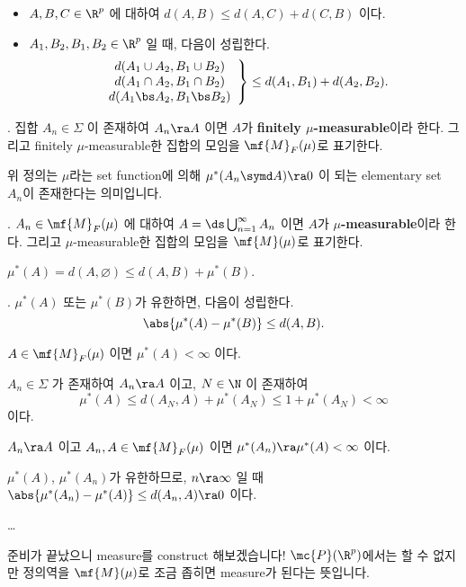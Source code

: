 \rmk
\begin{itemize}
    \item \(A, B, C \in \R^p\) 에 대하여 \(d(A, B) \leq d(A, C) + d(C, B)\) 이다.
    \item \(A_1, B_2, B_1, B_2 \in \R^p\) 일 때, 다음이 성립한다.
          \[
              \left.\begin{array}{c}d(A_1 \cup A_2, B_1 \cup B_2) \\d(A_1 \cap A_2, B_1 \cap B_2) \\d(A_1 \bs A_2, B_1 \bs B_2)\end{array}\right\}
              \leq d(A_1, B_1) + d(A_2, B_2).
          \]
\end{itemize}

.  집합 \(A_n \in \Sigma\) 이 존재하여 \(A_n \ra A\) 이면 \(A\)가 \textbf{finitely \(\mu\)-measurable}이라 한다. 그리고 finitely \(\mu\)-measurable한 집합의 모임을 \(\mf{M}_F(\mu)\)로 표기한다.

위 정의는 \(\mu\)라는 set function에 의해 \(\mu^\ast (A_n \symd A) \ra 0\) 이 되는 elementary set \(A_n\)이 존재한다는 의미입니다.

.  \(A_n \in \mf{M}_F(\mu)\) 에 대하여 \(A = \ds \bigcup_{n=1}^\infty A_n\) 이면 \(A\)가 \textbf{\(\mu\)-measurable}이라 한다. 그리고 \(\mu\)-measurable한 집합의 모임을 \(\mf{M}(\mu)\)로 표기한다.

\rmk \(\mu^\ast(A) = d(A, \varnothing) \leq d(A, B) + \mu^\ast(B)\).

\prop. \(\mu^\ast(A)\) 또는 \(\mu^\ast(B)\)가 유한하면, 다음이 성립한다.
\[
    \abs{\mu^\ast(A) - \mu^\ast(B)} \leq d(A, B).
\]

\cor \(A \in \mf{M}_F(\mu)\) 이면 \(\mu^\ast(A) < \infty\) 이다.

\pf \(A_n \in \Sigma\) 가 존재하여 \(A_n \ra A\) 이고, \(N \in \N\) 이 존재하여
\[
    \mu^\ast(A) \leq d(A_N, A) + \mu^\ast(A_N) \leq 1 + \mu^\ast(A_N) < \infty
\]
이다.

\cor \(A_n \ra A\) 이고 \(A_n, A \in \mf{M}_F(\mu)\) 이면 \(\mu^\ast(A_n)\ra \mu^\ast(A) < \infty\) 이다.

\pf \(\mu^\ast(A)\), \(\mu^\ast(A_n)\)가 유한하므로, \(n \ra \infty\) 일 때 \(\abs{\mu^\ast(A_n) - \mu^\ast(A)} \leq d(A_n, A) \ra 0\) 이다.

\dots

준비가 끝났으니 measure를 construct 해보겠습니다! \(\mc{P}(\R^p)\)에서는 할 수 없지만 정의역을 \(\mf{M}(\mu)\)로 조금 좁히면 measure가 된다는 뜻입니다.

